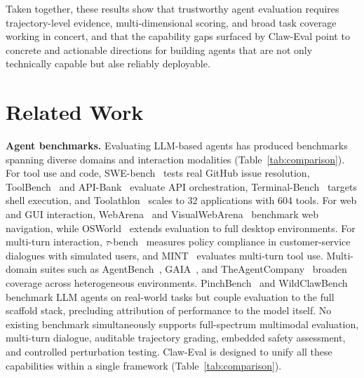\documentclass{article}
\begin{document}
\noindent Taken together, these results show that trustworthy agent evaluation requires trajectory-level evidence, multi-dimensional scoring, and broad task coverage working in concert, and that the capability gaps surfaced by Claw-Eval point to concrete and actionable directions for building agents that are not only technically  capable but alse reliably deployable.


\section{Related Work}
\label{sec:related}


\textbf{Agent benchmarks.}
Evaluating LLM-based agents has produced benchmarks spanning diverse domains and interaction modalities (Table~\ref{tab:comparison}).
For tool use and code, SWE-bench~\citep{jimenez2024swebench} tests real GitHub issue resolution, ToolBench~\citep{xu2023tool} and API-Bank~\citep{li2023api} evaluate API orchestration, Terminal-Bench~\citep{merrill2026terminal} targets shell execution, and Toolathlon~\citep{li2025tool} scales to 32 applications with 604 tools.
For web and GUI interaction, WebArena~\citep{zhouwebarena} and VisualWebArena~\citep{koh2024visualwebarena} benchmark web navigation, while OSWorld~\citep{xie2024osworld} extends evaluation to full desktop environments.
For multi-turn interaction, $\tau$-bench~\citep{yao2025tau} measures policy compliance in customer-service dialogues with simulated users, and MINT~\citep{wangmint} evaluates multi-turn tool use.
Multi-domain suites such as AgentBench~\citep{liuagentbench}, GAIA~\citep{mialon2023gaia}, and TheAgentCompany~\citep{xutheagentcompany} broaden coverage across heterogeneous environments.
PinchBench~\citep{pinchbench} and WildClawBench~\citep{wildclawbench} benchmark LLM agents on real-world tasks but couple evaluation to the full scaffold stack, precluding attribution of performance to the model itself.
No existing benchmark simultaneously supports full-spectrum multimodal evaluation, multi-turn dialogue, auditable trajectory grading, embedded safety assessment, and controlled perturbation testing.
Claw-Eval is designed to unify all these capabilities within a single framework (Table~\ref{tab:comparison}).
\end{document}
